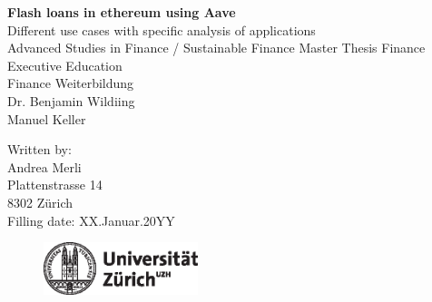 \documentclass[11pt,a4paper,titlepage]{scrartcl}
\begin{document}
 


\newpage

\thispagestyle{plain}
\begin{titlepage}

\begin{center}

\huge{\textbf{Flash loans in ethereum using Aave}}\\[1.5ex]
\LARGE{Different use cases with specific analysis of applications}\\[6ex]
\Large{Advanced Studies in Finance / Sustainable Finance Master Thesis 
Finance Executive Education  \\
Finance Weiterbildung}\\[1.5ex]
\Large{Dr. Benjamin Wildiing}\\
\Large{Manuel Keller}\\[12	ex]


\end{center}


\normalsize
\begin{flushleft}
Written by:\\[3ex]
Andrea Merli\\[1ex]
Plattenstrasse 14\\[1ex]
8302 Zürich\\[3ex]

Filling date: XX.Januar.20YY\\[10ex]
\end{flushleft}

\begin {figure}[h]
\begin {center}
\includegraphics [width=4.5cm] {uzh_logo_d_pos.eps}
\end {center}
\end {figure}


\end{titlepage}



\end{document}
